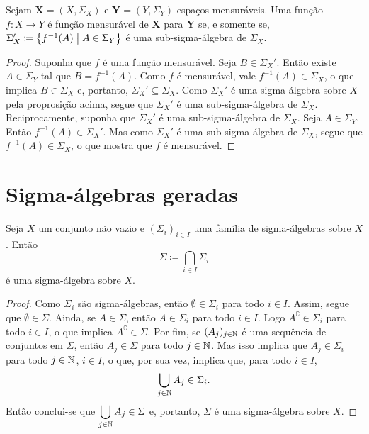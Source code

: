 \begin{prop}
	Sejam $\bm X = (X,\Sigma_ X)$ e $\bm Y = (Y,\Sigma_ Y)$ espaços mensuráveis. Uma função $f: X \to Y$ é função mensurável de $\bm X$ para $\bm Y$ se, e somente se, $\Sigma_ X' \coloneqq \set{f^{-1}(A)}{A \in \Sigma_ Y}$ é uma sub-sigma-álgebra de $\Sigma_ X$.
\end{prop}
\begin{proof}
	Suponha que $f$ é uma função mensurável. Seja $B \in \Sigma_ X'$. Então existe $A \in \Sigma_ Y$ tal que $B = f^{-1}(A)$. Como $f$ é mensurável, vale $f^{-1}(A) \in \Sigma_ X$, o que implica $B \in \Sigma_ X$ e, portanto, $\Sigma_ X' \subseteq \Sigma_ X$. Como $\Sigma_ X'$ é uma sigma-álgebra sobre $X$ pela proprosição acima, segue que $\Sigma_ X'$ é uma sub-sigma-álgebra de $\Sigma_ X$. Reciprocamente, suponha que $\Sigma_ X'$ é uma sub-sigma-álgebra de $\Sigma_ X$. Seja $A \in \Sigma_ Y$. Então $f^{-1}(A) \in \Sigma_ X'$. Mas como $\Sigma_ X'$ é uma sub-sigma-álgebra de $\Sigma_ X$, segue que $f^{-1}(A) \in \Sigma_ X$, o que mostra que $f$ é mensurável. 
\end{proof}

\section{Sigma-álgebras geradas}

\begin{prop}
Seja $X$ um conjunto não vazio e $(\Sigma_i)_{i \in I}$ uma família de sigma-álgebras sobre $X$. Então
	\begin{equation*}
	\Sigma \coloneqq \bigcap_{i \in I} \Sigma_i
	\end{equation*}
é uma sigma-álgebra sobre $X$.
\end{prop}
\begin{proof}
	Como $\Sigma_i$ são sigma-álgebras, então $\emptyset \in \Sigma_i$ para todo $i \in I$. Assim, segue que $\emptyset \in \Sigma$. Ainda, se $A \in \Sigma$, então $A \in \Sigma_i$ para todo $i \in I$. Logo $A^\complement \in \Sigma_i$ para todo $i \in I$, o que implica $A^\complement \in \Sigma$. Por fim, se $(A_j)_{j \in \mathbb{N}}$ é uma sequência de conjuntos em $\Sigma$, então $A_j \in \Sigma$ para todo $j \in \mathbb{N}$. Mas isso implica que $A_j \in \Sigma_i$ para todo $j \in \mathbb{N}$, $i \in I$, o que, por sua vez, implica que, para todo $i \in I$,
	\begin{equation*}
	\bigcup_{j \in \mathbb{N}} A_j \in \Sigma_i.
	\end{equation*}
Então conclui-se que $\displaystyle\bigcup_{j \in \mathbb{N}} A_j \in \Sigma$ e, portanto, $\Sigma$ é uma sigma-álgebra sobre $X$.
\end{proof}

